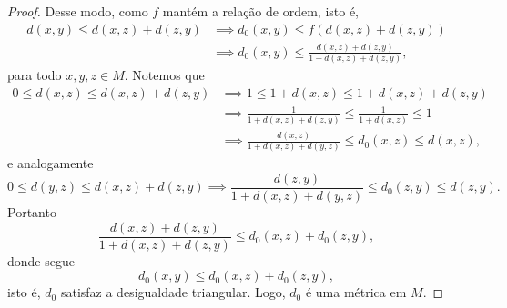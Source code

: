 \begin{proof}
    Desse modo, como \(f\) mantém a relação de ordem, isto é,
    \begin{align*}
        d(x,y) \leq d(x,z) + d(z, y) &\implies d_0(x,y) \leq f(d(x,z) + d(z,y))\\
                                     &\implies d_0(x,y) \leq \frac{d(x,z) + d(z,y)}{1 + d(x,z) + d(z,y)},
    \end{align*}
    para todo \(x,y,z \in M\). Notemos que
    \begin{align*}
        0 \leq d(x,z) \leq d(x,z) + d(z,y) &\implies 1 \leq 1 + d(x,z) \leq 1 + d(x,z) + d(z,y)\\
                                           &\implies \frac{1}{1+d(x,z) + d(z,y)} \leq \frac{1}{1+d(x,z)} \leq 1\\
                                           &\implies \frac{d(x,z)}{1+d(x,z)+d(y,z)} \leq d_0(x,z) \leq d(x,z),
    \end{align*}
    e analogamente
    \begin{equation*}
        0 \leq d(y,z) \leq d(x,z) + d(z,y) \implies \frac{d(z,y)}{1+d(x,z)+d(y,z)} \leq d_0(z,y) \leq d(z,y).
    \end{equation*}
    Portanto
    \begin{equation*}
        \frac{d(x,z) + d(z,y)}{1 + d(x,z) + d(z,y)} \leq d_0(x,z) + d_0(z,y),
    \end{equation*}
    donde segue
    \begin{equation*}
        d_0(x,y) \leq d_0(x,z) + d_0(z,y),
    \end{equation*}
    isto é, \(d_0\) satisfaz a desigualdade triangular. Logo, \(d_0\) é uma métrica em \(M\).
\end{proof}
